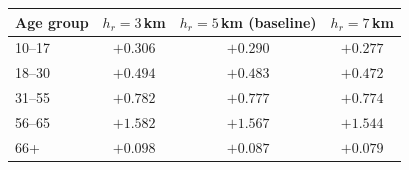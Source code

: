 \begin{tabular}{lccc}
\toprule
\textbf{Age group} & \textbf{$h_r = 3$\,km} & \textbf{$h_r = 5$\,km (baseline)} & \textbf{$h_r = 7$\,km} \\
\midrule
10--17 & $+0.306$ & $+0.290$ & $+0.277$ \\
18--30 & $+0.494$ & $+0.483$ & $+0.472$ \\
31--55 & $+0.782$ & $+0.777$ & $+0.774$ \\
56--65 & $+1.582$ & $+1.567$ & $+1.544$ \\
66+ & $+0.098$ & $+0.087$ & $+0.079$ \\
\bottomrule
\end{tabular}
